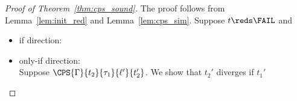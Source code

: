 \begin{proof}[Proof of Theorem~\ref{thm:cps_sound}]
The proof follows from Lemma~\ref{lem:init_red} and Lemma~\ref{lem:cps_sim}.
Suppose $t \reds \FAIL$ and
\begin{itemize}
\item if direction: \\

\item only-if direction: \\
      Suppose $\CPS{\Gamma}{t_2}{\tau_1}{\ell'}{t_2'}$.
      We show that $t_2'$ diverges if $t_1'$
\end{itemize}
\end{proof}
